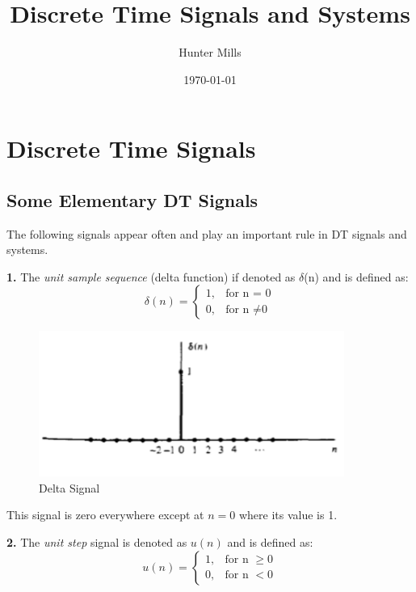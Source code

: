 \documentclass{article} %
\title{Discrete Time Signals and Systems} %
\author{Hunter Mills} %
\date{\today} %
\begin{document}
    \maketitle %
    
    \section{Discrete Time Signals} %
    
    \subsection{Some Elementary DT Signals}
    The following signals appear often and play an important rule in DT signals and systems.
    
    \textbf{1.} The \textit{unit sample sequence} (delta function) if denoted as $\delta$(n) and is defined as:
    \begin{equation}
 	 \delta (n) =
    	\begin{cases}
      	1, & \text{for n = 0}\\
      	0, & \text{for n } \neq \text{0}
    	\end{cases}       
	\end{equation}
    
    \begin{figure}[h]
    \centering
	\includegraphics[width=10cm]{delta}
	\caption{Delta Signal}
	\end{figure}
	This signal is zero everywhere except at $n = 0$ where its value is 1.
	
	\textbf{2.} The \textit{unit step} signal is denoted as $u(n)$ and is defined as:
	\begin{equation}
 	 u(n) =
    	\begin{cases}
      	1, & \text{for n } \ge { 0}\\
      	0, & \text{for n } < { 0}
    	\end{cases}       
	\end{equation}
    
\end{document}

